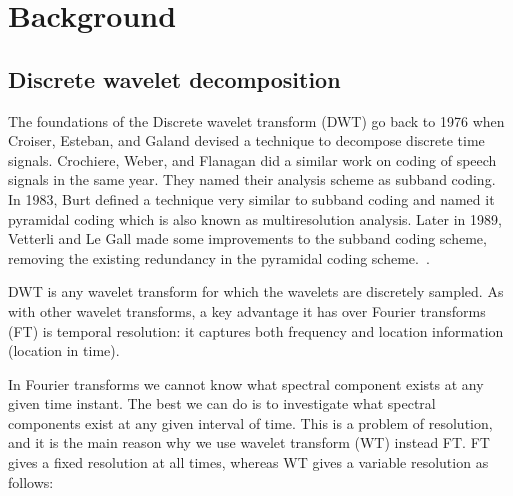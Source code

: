 \chapter{Background}
\label{cp:Background}

\section{Discrete wavelet decomposition}

The foundations of the Discrete wavelet transform (DWT) go back to 1976 when Croiser, Esteban, and Galand devised a technique to decompose discrete time signals. Crochiere, Weber, and Flanagan did a similar work on coding of speech signals in the same year. They named their analysis scheme as subband coding. In 1983, Burt defined a technique very similar to subband coding and named it pyramidal coding which is also known as multiresolution analysis. Later in 1989, Vetterli and Le Gall made some improvements to the subband coding scheme, removing the existing redundancy in the pyramidal coding scheme.~\cite{polikar1996wavelet}.

DWT is any wavelet transform for which the wavelets are discretely sampled. As with other wavelet transforms, a key advantage it has over Fourier transforms (FT) is temporal resolution: it captures both frequency and location information (location in time). 

In Fourier transforms we cannot know what spectral component exists at any given time instant. The best we can do is to investigate what spectral components exist at any given interval of time. This is a problem of resolution, and it is the main reason why we use wavelet transform (WT) instead FT. FT gives a fixed resolution at all times, whereas WT gives a variable resolution as follows:

